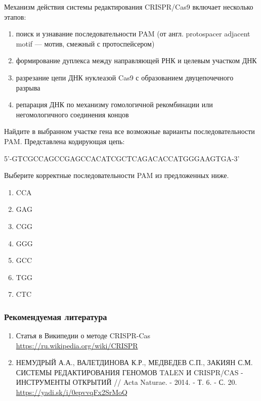 
Механизм действия системы редактирования CRISPR/Cas9 включает несколько этапов:

\begin{enumerate}
    \item поиск и узнавание последовательности PAM (от англ. protospacer adjacent motif — мотив, смежный с протоспейсером)
    \item формирование дуплекса между направляющей РНК и целевым участком ДНК
    \item разрезание цепи ДНК нуклеазой Cas9 с образованием двуцепочечного разрыва
    \item репарация ДНК по механизму гомологичной рекомбинации или негомологичного соединения концов
\end{enumerate}

Найдите в выбранном участке гена все возможные варианты последовательности PAM. Представлена кодирующая цепь:

5'-GTCGCCAGCCGAGCCACATCGCTCAGACACCATGGGAAGTGA-3'

Выберите корректные последовательности PAM из предложенных ниже.

\begin{enumerate}
    \item CCA
    \item GAG
    \item CGG
    \item GGG
    \item GCC
    \item TGG
    \item CTC
\end{enumerate}


\subsubsection*{Рекомендуемая литература}

\begin{enumerate}
    \item Статья в Википедии о методе CRISPR-Cas \url{https://ru.wikipedia.org/wiki/CRISPR}
    \item НЕМУДРЫЙ А.А., ВАЛЕТДИНОВА К.Р., МЕДВЕДЕВ С.П., ЗАКИЯН С.М. СИСТЕМЫ РЕДАКТИРОВАНИЯ ГЕНОМОВ TALEN И CRISPR/CAS - ИНСТРУМЕНТЫ ОТКРЫТИЙ // Acta Naturae. - 2014. - Т. 6. - С. 20.  \url{https://yadi.sk/i/0epvvqFx2SrMoQ} 
\end{enumerate}